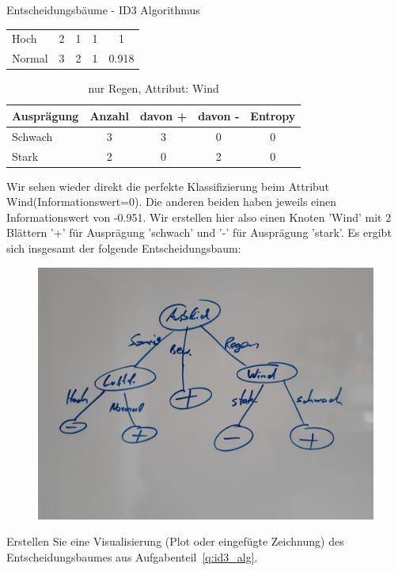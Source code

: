 \begin{task}[credit=16]{Entscheidungsbäume - ID3 Algorithmus}
\begin{subtask}[points=10,title=ID3 Algorithmus]
\begin{solution}
\begin{table}[H]
\begin{tabular}{l|c|c|c|c}
		\midrule
		Hoch&2&1&1&1\\
		Normal&3&2&1&0.918\\
		\bottomrule
	\end{tabular}
\end{table}
\begin{table}[H]
	\centering
	\caption{nur Regen, Attribut: Wind}
	\begin{tabular}{l|c|c|c|c}
		\toprule
		\textbf{Ausprägung} & \textbf{Anzahl} & \textbf{davon +}  & \textbf{davon -} &\textbf{Entropy} \\
		\midrule
		Schwach&3&3&0&0\\
		Stark&2&0&2&0\\
		\bottomrule
	\end{tabular}
\end{table}
Wir sehen wieder direkt die perfekte Klassifizierung beim Attribut Wind(Informationswert=0). Die anderen beiden haben jeweils einen Informationswert von -0.951. Wir erstellen hier also einen Knoten 'Wind' mit 2 Blättern '+' für Ausprägung 'schwach' und '-' für Ausprägung 'stark'. Es ergibt sich insgesamt der folgende Entscheidungsbaum:
\begin{figure}[H]
	\includegraphics[scale=0.5]{1a.jpg}
\end{figure}
\end{solution}

\end{subtask}

\begin{subtask}[points=3,title=Visualisierung]
Erstellen Sie eine Visualisierung (Plot oder eingefügte Zeichnung) des Entscheidungsbaumes aus Aufgabenteil~\ref{q:id3_alg}.


\end{subtask}
\end{task}
